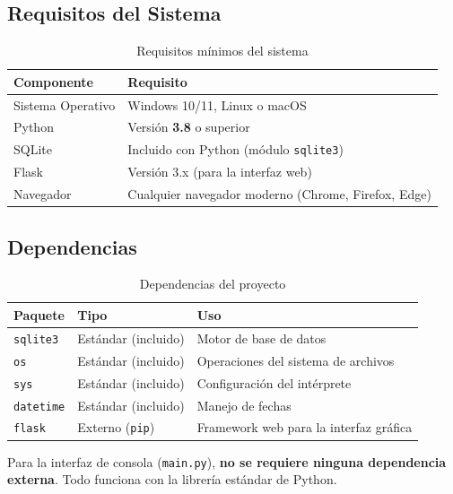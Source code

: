 \documentclass[12pt, a4paper]{article}
\begin{document}
\subsection{Requisitos del Sistema}

\begin{table}[H]
    \centering
    \begin{tabularx}{\textwidth}{l X}
        \toprule
        \textbf{Componente} & \textbf{Requisito} \\
        \midrule
        Sistema Operativo & Windows 10/11, Linux o macOS \\
        Python & Versión \textbf{3.8} o superior \\
        SQLite & Incluido con Python (módulo \texttt{sqlite3}) \\
        Flask & Versión 3.x (para la interfaz web) \\
        Navegador & Cualquier navegador moderno (Chrome, Firefox, Edge) \\
        \bottomrule
    \end{tabularx}
    \caption{Requisitos mínimos del sistema}
\end{table}

\subsection{Dependencias}

\begin{table}[H]
    \centering
    \begin{tabularx}{\textwidth}{l l X}
        \toprule
        \textbf{Paquete} & \textbf{Tipo} & \textbf{Uso} \\
        \midrule
        \texttt{sqlite3} & Estándar (incluido) & Motor de base de datos \\
        \texttt{os} & Estándar (incluido) & Operaciones del sistema de archivos \\
        \texttt{sys} & Estándar (incluido) & Configuración del intérprete \\
        \texttt{datetime} & Estándar (incluido) & Manejo de fechas \\
        \texttt{flask} & Externo (\texttt{pip}) & Framework web para la interfaz gráfica \\
        \bottomrule
    \end{tabularx}
    \caption{Dependencias del proyecto}
\end{table}

\begin{infobox}[Nota]
Para la interfaz de consola (\texttt{main.py}), \textbf{no se requiere ninguna dependencia externa}. Todo funciona con la librería estándar de Python.
\end{infobox}
\end{document}
